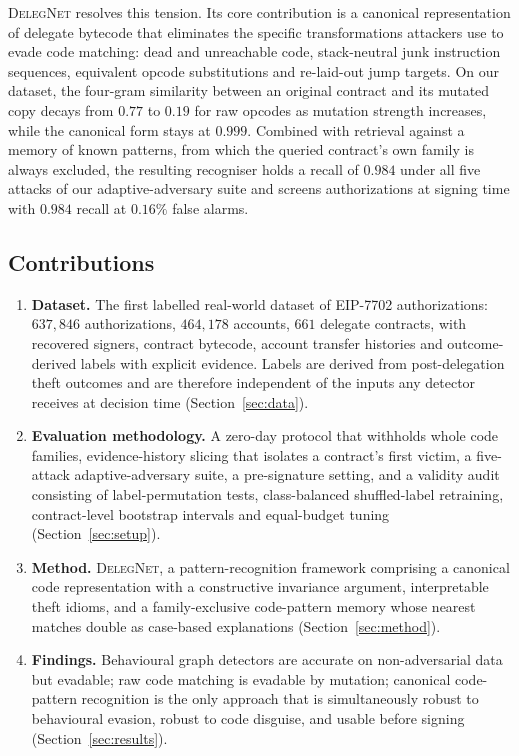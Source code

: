 \documentclass[journal]{IEEEtran}
\newcommand{\dn}{\textsc{DelegNet}}
\begin{document}
\dn{} resolves this tension. Its core contribution is a canonical representation of delegate bytecode that eliminates the specific transformations attackers use to evade code matching: dead and unreachable code, stack-neutral junk instruction sequences, equivalent opcode substitutions and re-laid-out jump targets. On our dataset, the four-gram similarity between an original contract and its mutated copy decays from $0.77$ to $0.19$ for raw opcodes as mutation strength increases, while the canonical form stays at $0.999$. Combined with retrieval against a memory of known patterns, from which the queried contract's own family is always excluded, the resulting recogniser holds a recall of $0.984$ under all five attacks of our adaptive-adversary suite and screens authorizations at signing time with $0.984$ recall at $0.16\%$ false alarms.

\subsection{Contributions}
\begin{enumerate}
\item \textbf{Dataset.} The first labelled real-world dataset of EIP-7702 authorizations: $637{,}846$ authorizations, $464{,}178$ accounts, $661$ delegate contracts, with recovered signers, contract bytecode, account transfer histories and outcome-derived labels with explicit evidence. Labels are derived from post-delegation theft outcomes and are therefore independent of the inputs any detector receives at decision time (Section~\ref{sec:data}).
\item \textbf{Evaluation methodology.} A zero-day protocol that withholds whole code families, evidence-history slicing that isolates a contract's first victim, a five-attack adaptive-adversary suite, a pre-signature setting, and a validity audit consisting of label-permutation tests, class-balanced shuffled-label retraining, contract-level bootstrap intervals and equal-budget tuning (Section~\ref{sec:setup}).
\item \textbf{Method.} \dn{}, a pattern-recognition framework comprising a canonical code representation with a constructive invariance argument, interpretable theft idioms, and a family-exclusive code-pattern memory whose nearest matches double as case-based explanations (Section~\ref{sec:method}).
\item \textbf{Findings.} Behavioural graph detectors are accurate on non-adversarial data but evadable; raw code matching is evadable by mutation; canonical code-pattern recognition is the only approach that is simultaneously robust to behavioural evasion, robust to code disguise, and usable before signing (Section~\ref{sec:results}).
\end{enumerate}
\end{document}
